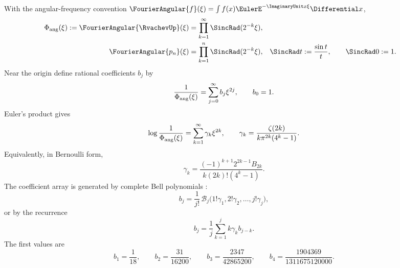 With the angular-frequency convention
$\FourierAngular{f}(\xi)=\int f(x)\EulerE^{-\ImaginaryUnit x\xi}\Differential x$,
\begin{equation}
 \begin{aligned}
 \PhiAng(\xi):=\FourierAngular{\RvachevUp}(\xi)
   &=\prod_{k=1}^{\infty}\SincRad(2^{-k}\xi),\\
 \FourierAngular{p_n}(\xi)
   &=\prod_{k=1}^{n}\SincRad(2^{-k}\xi),
 &\SincRad t&:=\frac{\sin t}{t},\qquad \SincRad0:=1.
 \end{aligned}
 \label{is:p1:eq:Phi-products}
\end{equation}
Near the origin define rational coefficients $b_j$ by
\begin{equation}
 \frac1{\Phi_{\mathrm{ang}}(\xi)}=\sum_{j=0}^{\infty}b_j\xi^{2j},
 \qquad b_0=1.
 \label{is:p1:eq:b-def}
\end{equation}
Euler's product gives
\begin{equation}
 \log\frac1{\Phi_{\mathrm{ang}}(\xi)}=\sum_{k=1}^{\infty}\gamma_k\xi^{2k},
 \qquad
 \gamma_k=\frac{\zeta(2k)}{k\pi^{2k}(4^k-1)}.
 \label{is:p1:eq:gamma-def}
\end{equation}
Equivalently, in Bernoulli form,
\begin{equation}
 \gamma_k=\frac{(-1)^{k+1}2^{2k-1}B_{2k}}
 {k(2k)!(4^k-1)}.
 \label{is:p1:eq:gamma-Bernoulli}
\end{equation}
The coefficient array is generated by complete Bell polynomials \cite{is:p1:Comtet}:
\begin{equation}
 \boxed{
 b_j=\frac1{j!}\,
 \mathcal B_j\bigl(1!\gamma_1,2!\gamma_2,\ldots,j!\gamma_j\bigr),}
 \label{is:p1:eq:b-Bell}
\end{equation}
or by the recurrence
\begin{equation}
 b_j=\frac1j\sum_{k=1}^{j}k\gamma_kb_{j-k}.
 \label{is:p1:eq:b-rec}
\end{equation}
The first values are
\begin{equation}
 b_1=\frac1{18},\qquad
 b_2=\frac{31}{16200},\qquad
 b_3=\frac{2347}{42865200},\qquad
 b_4=\frac{1904369}{1311675120000}.
 \label{is:p1:eq:b-first}
\end{equation}

